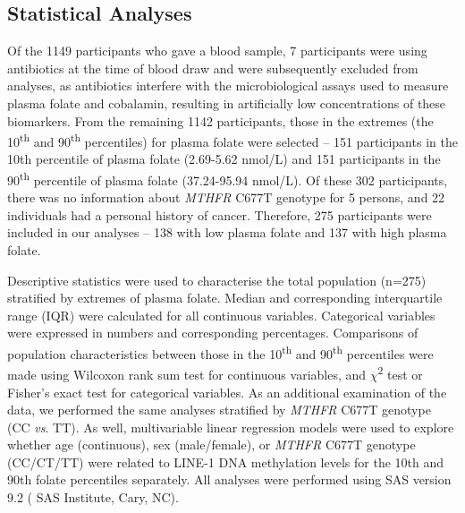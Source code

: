 \subsection{Statistical Analyses} %
\noindent Of the 1149 participants who gave a blood sample, 7 participants were using antibiotics at the time of blood draw and were subsequently excluded from analyses, as antibiotics interfere with the microbiological assays used to measure plasma folate and cobalamin, resulting in artificially low concentrations of these biomarkers. From the remaining 1142 participants, those in the extremes (the 10\textsuperscript{th} and 90\textsuperscript{th} percentiles) for plasma folate were selected -- 151 participants in the 10th percentile of plasma folate (2.69-5.62 nmol/L) and 151 participants in the 90\textsuperscript{th} percentile of plasma folate (37.24-95.94 nmol/L). Of these 302 participants, there was no information about \emph{MTHFR} C677T genotype for 5 persons, and 22 individuals had a personal history of cancer. Therefore, 275 participants were included in our analyses -- 138 with low plasma folate and 137 with high plasma folate.

\noindent Descriptive statistics were used to characterise the total population (n=275) stratified by extremes of plasma folate. Median and corresponding interquartile range (IQR) were calculated for all continuous variables. Categorical variables were expressed in numbers and corresponding percentages. Comparisons of population characteristics between those in the 10\textsuperscript{th} and 90\textsuperscript{th} percentiles were made using Wilcoxon rank sum test for continuous variables, and $\chi$\textsuperscript{2} test or Fisher's exact test for categorical variables. As an additional examination of the data, we performed the same analyses stratified by \emph{MTHFR} C677T genotype (CC \emph{vs}. TT). As well, multivariable linear regression models were used to explore whether age (continuous), sex (male/female), or \emph{MTHFR} C677T genotype (CC/CT/TT) were related to LINE-1 DNA methylation levels for the 10th and 90th folate percentiles separately. All analyses were performed using SAS version 9.2 (
SAS Institute, Cary, NC). 

